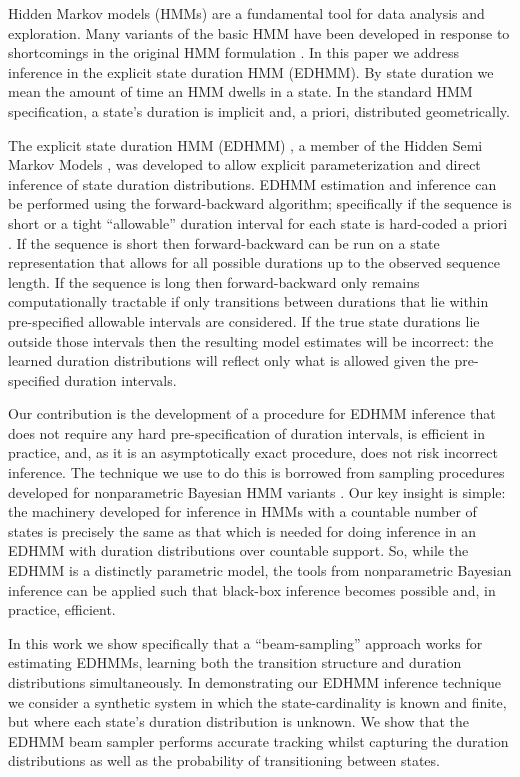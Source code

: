 \label{section}
Hidden Markov models (HMMs) are a fundamental tool for data analysis and exploration.  Many variants of the basic HMM have been developed in response to shortcomings in the original HMM formulation \cite{Rabiner89}.  In this paper we address inference in the explicit state duration HMM (EDHMM).  By state duration we mean the amount of time an HMM dwells in a state.  In the standard HMM specification, a state's duration is implicit and, a priori, distributed geometrically.

The explicit state duration HMM (EDHMM) \cite{Rabiner89}, a member of the Hidden Semi Markov Models \cite{Yu10}, was developed to 
allow explicit parameterization and direct inference of state duration 
distributions.   EDHMM estimation and inference can be performed using the 
forward-backward algorithm; specifically if the sequence is short or a tight 
``allowable'' duration interval for each state is hard-coded a priori 
\cite{Yu2006}.   If the sequence is short then forward-backward can be run 
on a state representation that allows for all possible durations up to the 
observed sequence length.  If the sequence is long then forward-backward 
only remains computationally tractable if only transitions between durations 
that lie within pre-specified allowable intervals are considered.   If the 
true state durations lie outside those intervals then the resulting model 
estimates will be incorrect: the learned duration distributions will reflect 
only what is allowed given the pre-specified duration intervals. %

Our contribution is the development of a procedure for EDHMM inference that does not require any hard pre-specification of duration intervals, is efficient in practice, and, as it is an asymptotically exact procedure, does not risk incorrect inference.  The technique we use to do this 
is borrowed from sampling procedures developed for nonparametric  Bayesian HMM variants \cite{vanGael2008}.  Our key insight is simple: the machinery developed for inference in HMMs with a countable number of states is precisely the same as that which is needed for doing inference in an EDHMM with duration distributions over countable support.  So, while the EDHMM is a distinctly parametric model, the tools from nonparametric Bayesian inference can be applied such that black-box inference becomes possible and, in practice, efficient.

In this work we show specifically that a ``beam-sampling'' approach  \cite{vanGael2008} works for  estimating EDHMMs, learning both the transition structure and duration distributions simultaneously.  In demonstrating our EDHMM inference technique we consider a synthetic system  in which the state-cardinality is known and finite, but where each state's duration distribution is unknown. We show that the EDHMM beam sampler performs accurate tracking whilst capturing the duration distributions as well as the probability of transitioning between states.

